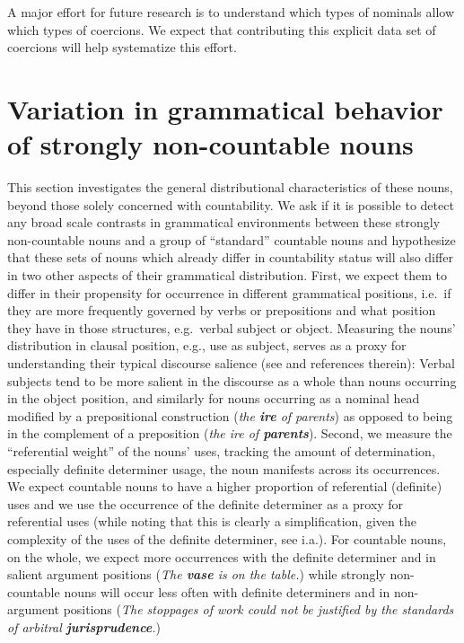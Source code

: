 \documentclass[output=paper]{langscibook}
\begin{document}
A major effort for  future research is to understand which types of nominals allow which types of coercions.  We expect that contributing this explicit data set of coercions will help systematize this effort.






\section{Variation in grammatical behavior of strongly non-countable nouns}\label{gri-ric:sec:quantitative}\largerpage[-2]

This section investigates the general distributional characteristics of these nouns, beyond those solely concerned with countability.  We ask if it is possible to detect any broad scale contrasts in grammatical environments between these strongly non-countable nouns  and a group of ``standard'' countable nouns and hypothesize that these sets of nouns which already differ in countability status will also differ in two other aspects of their grammatical distribution.  First, we expect them to differ in their propensity for occurrence in different grammatical positions, i.e.\ if they are more frequently governed by verbs or prepositions and what position they have in those structures, e.g.\ verbal subject or object. Measuring the nouns' distribution in clausal position, e.g., use as subject, serves as a proxy for understanding their typical discourse salience (see \citealt{kaiser2006effects} and references therein): Verbal subjects tend to be more salient in the discourse as a whole than nouns occurring in the object position, and similarly for nouns occurring as a nominal head modified by a prepositional construction (\textit{the \textbf{ire} of parents}) as opposed to being in the complement of a preposition (\textit{the ire of \textbf{parents}}).  Second, we measure the ``referential weight'' of the nouns' uses, tracking the amount of determination, especially definite determiner usage, the noun manifests across its occurrences.  We expect countable nouns to have a higher proportion of referential (definite) uses and we use the occurrence of the definite determiner as a proxy for referential uses (while noting that this is clearly a simplification, given the complexity of the uses of the definite determiner, see \citealt{lyons1999definiteness} i.a.).  For countable nouns, on the whole, we expect more occurrences with the definite determiner and in salient argument positions (\textit{The \textbf{vase} is on the table.}) while strongly non-countable nouns will occur less often with definite determiners and in non-argument positions (\textit{The stoppages of work could not be justified by the standards of arbitral \textbf{jurisprudence}.})
\end{document}
